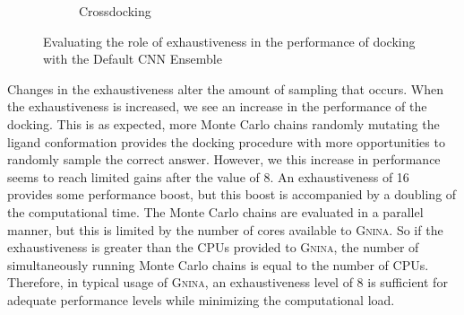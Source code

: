\documentclass[journal=jcisd8,manuscript=article]{achemso}
\begin{document}
\begin{figure}
\begin{subfigure}[b]{0.48\textwidth}
		\caption{Crossdocking}
		\label{fig:exhaustiveness cd}
        \end{subfigure}    
	\caption{Evaluating the role of exhaustiveness in the performance of docking with the Default CNN Ensemble}
	\label{fig:exhaustiveness}
\end{figure}    

Changes in the exhaustiveness alter the amount of sampling that occurs. When the exhaustiveness is increased, we see an increase in the performance of the docking. This is as expected, more Monte Carlo chains randomly mutating the ligand conformation provides the docking procedure with more opportunities to randomly sample the correct answer. However, we this increase in performance seems to reach limited gains after the value of 8. An exhaustiveness of 16 provides some performance boost, but this boost is accompanied by a doubling of the computational time. The Monte Carlo chains are evaluated in a parallel manner, but this is limited by the number of cores available to \textsc{Gnina}. So if the exhaustiveness is greater than the CPUs provided to \textsc{Gnina}, the number of simultaneously running Monte Carlo chains is equal to the number of CPUs. Therefore, in typical usage of \textsc{Gnina}, an exhaustiveness level of 8 is sufficient for adequate performance levels while minimizing the computational load.
\end{document}
